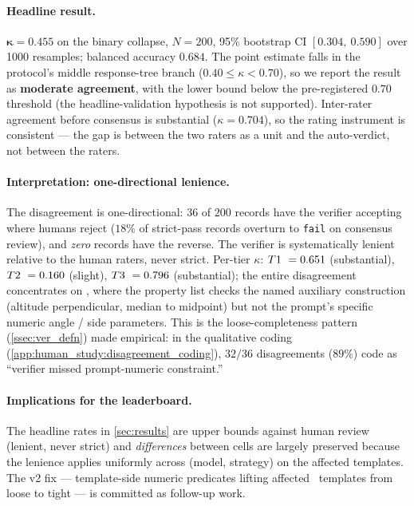 \paragraph{Headline result.}
$\boldsymbol{\kappa = 0.455}$ on the binary collapse, $N{=}200$, 95\% bootstrap CI $[0.304,\ 0.590]$ over 1000 resamples; balanced accuracy $0.684$.
The point estimate falls in the protocol's middle response-tree branch ($0.40 \leq \kappa < 0.70$), so we report the result as \textbf{moderate agreement}, with the lower bound below the pre-registered $0.70$ threshold (the headline-validation hypothesis is not supported).
Inter-rater agreement before consensus is substantial ($\kappa = 0.704$), so the rating instrument is consistent --- the gap is between the two raters as a unit and the auto-verdict, not between the raters.

\paragraph{Interpretation: one-directional lenience.}
The disagreement is one-directional: $36$ of $200$ records have the verifier accepting where humans reject ($18\%$ of strict-pass records overturn to \texttt{fail} on consensus review), and \emph{zero} records have the reverse.
The verifier is systematically lenient relative to the human raters, never strict.
Per-tier $\kappa$: $T1\ = 0.651$ (substantial), $T2\ = 0.160$ (slight), $T3\ = 0.796$ (substantial); the entire disagreement concentrates on \ttwo, where the property list checks the named auxiliary construction (altitude perpendicular, median to midpoint) but not the prompt's specific numeric angle / side parameters.
This is the loose-completeness pattern (\cref{ssec:ver_defn}) made empirical: in the qualitative coding (\cref{app:human_study:disagreement_coding}), $32 / 36$ disagreements ($89\%$) code as ``verifier missed prompt-numeric constraint.''

\paragraph{Implications for the leaderboard.}
The headline rates in \cref{sec:results} are upper bounds against human review (lenient, never strict) and \emph{differences} between cells are largely preserved because the lenience applies uniformly across (model, strategy) on the affected templates.
The v2 fix --- template-side numeric predicates lifting affected \ttwo\ templates from loose to tight --- is committed as follow-up work.
